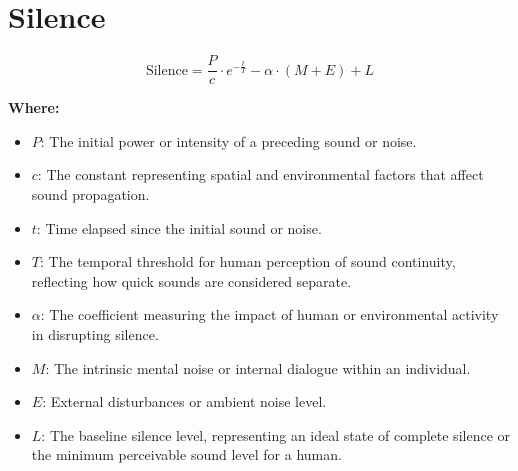 \chapter{Silence}

\begin{equation}
\text{Silence} = \frac{P}{c} \cdot e^{-\frac{t}{T}} - \alpha \cdot (M + E) + L
\end{equation}

\textbf{Where:}

\begin{itemize}
    \item $P$: The initial power or intensity of a preceding sound or noise.
    \item $c$: The constant representing spatial and environmental factors that affect sound propagation.
    \item $t$: Time elapsed since the initial sound or noise.
    \item $T$: The temporal threshold for human perception of sound continuity, reflecting how quick sounds are considered separate.
    \item $\alpha$: The coefficient measuring the impact of human or environmental activity in disrupting silence.
    \item $M$: The intrinsic mental noise or internal dialogue within an individual.
    \item $E$: External disturbances or ambient noise level.
    \item $L$: The baseline silence level, representing an ideal state of complete silence or the minimum perceivable sound level for a human.
\end{itemize}